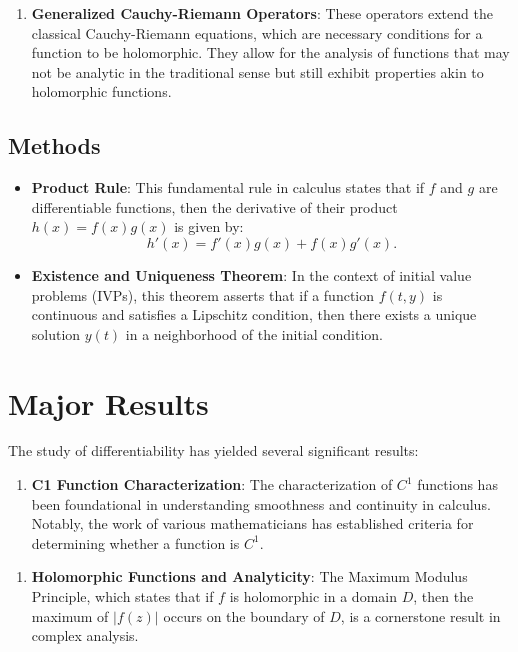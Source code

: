 \documentclass[11pt,a4paper]{article}
\begin{document}
\begin{enumerate}
\item \textbf{Generalized Cauchy-Riemann Operators}: These operators extend the classical Cauchy-Riemann equations, which are necessary conditions for a function to be holomorphic. They allow for the analysis of functions that may not be analytic in the traditional sense but still exhibit properties akin to holomorphic functions.
\end{enumerate}

\subsection{Methods}
\begin{itemize}
\item \textbf{Product Rule}: This fundamental rule in calculus states that if \( f \) and \( g \) are differentiable functions, then the derivative of their product \( h(x) = f(x)g(x) \) is given by:
\[
h'(x) = f'(x)g(x) + f(x)g'(x).
\]
\item \textbf{Existence and Uniqueness Theorem}: In the context of initial value problems (IVPs), this theorem asserts that if a function \( f(t, y) \) is continuous and satisfies a Lipschitz condition, then there exists a unique solution \( y(t) \) in a neighborhood of the initial condition.
\end{itemize}

\section{Major Results}

The study of differentiability has yielded several significant results:

\begin{enumerate}
\item \textbf{C1 Function Characterization}: The characterization of \( C^1 \) functions has been foundational in understanding smoothness and continuity in calculus. Notably, the work of various mathematicians has established criteria for determining whether a function is \( C^1 \).
\end{enumerate}

\begin{enumerate}
\item \textbf{Holomorphic Functions and Analyticity}: The Maximum Modulus Principle, which states that if \( f \) is holomorphic in a domain \( D \), then the maximum of \( |f(z)| \) occurs on the boundary of \( D \), is a cornerstone result in complex analysis.
\end{enumerate}
\end{document}

